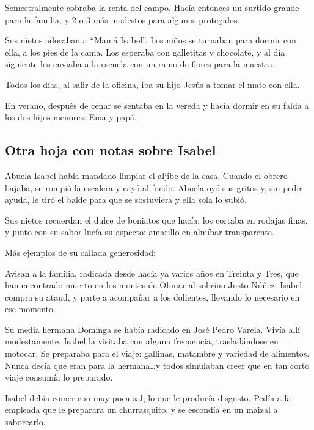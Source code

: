 \documentclass[a4paper]{article}
\begin{document}
Semestralmente cobraba la renta del campo. Hacía entonces un surtido grande para la familia, y 2 o 3 más modestos para algunos protegidos.

Sus nietos adoraban a ``Mamá Isabel''. Los niños se turnaban para dormir con ella, a los pies de la cama. Los esperaba con galletitas y chocolate, y al día siguiente los enviaba a la escuela con un ramo de flores para la maestra.

Todos los días, al salir de la oficina, iba su hijo Jesús a tomar el mate con ella.

En verano, después de cenar se sentaba en la vereda y hacía dormir en su falda a los dos hijos menores: Ema y papá.

\subsection{Otra hoja con notas sobre Isabel}

Abuela Isabel había mandado limpiar el aljibe de la casa. Cuando el obrero bajaba, se rompió la escalera y cayó al fondo. Abuela oyó sus gritos y, sin pedir ayuda, le tiró el balde para que se sostuviera y ella sola lo subió.

\bigbreak{}

Sus nietos recuerdan el dulce de boniatos que hacía: los cortaba en rodajas finas, y junto con su sabor lucía su aspecto: amarillo en almíbar transparente.

\bigbreak{}

Más ejemplos de su callada generosidad:

Avisan a la familia, radicada desde hacía ya varios años en Treinta y Tres, que han encontrado muerto en los montes de Olimar al sobrino Justo Núñez. Isabel compra su ataud, y parte a acompañar a los dolientes, llevando lo necesario en ese momento.

\bigbreak{}

Su media hermana Dominga se había radicado en José Pedro Varela. Vivía allí modestamente. Isabel la visitaba con alguna frecuencia, trasladándose en motocar. Se preparaba para el viaje: gallinas, matambre y variedad de alimentos. Nunca decía que eran para la hermana\ldots y todos simulaban creer que en tan corto viaje consumía lo preparado.

\bigbreak{}

Isabel debía comer con muy poca sal, lo que le producía disgusto. Pedía a la empleada que le preparara un churrasquito, y se escondía en un maizal a saborearlo.
\end{document}
